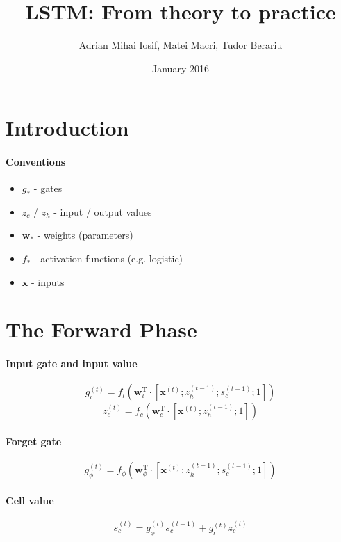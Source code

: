 \documentclass[12pt]{article}
\title{LSTM: From theory to practice}
\author{Adrian Mihai Iosif, Matei Macri, Tudor Berariu}
\date{January 2016}
\begin{document}
\maketitle

\section{Introduction}

\paragraph{Conventions}
\begin{itemize}
    \item $g_{*}$ - gates
    \item $z_{c}$ / $z_h$ - input / output values
    \item $\mathbf{w}_{*}$ - weights (parameters)
    \item $f_{*}$ - activation functions (e.g. logistic)
    \item $\mathbf{x}$ - inputs
\end{itemize}

\section{The Forward Phase}

\paragraph{Input gate and input value}

$$g_{\iota}^{(t)} = f_{\iota}\left(\mathbf{w}_{\iota}^{\text{T}} \cdot \left[\mathbf{x}^{(t)}; z_{h}^{(t-1)}; s_c^{(t-1)}; 1\right]\right)$$
$$z_{c}^{(t)} = f_{c}\left(\mathbf{w}_{c}^{\text{T}} \cdot \left[\mathbf{x}^{(t)}; z_{h}^{(t-1)}; 1\right]\right)$$

\paragraph{Forget gate}

$$g_{\phi}^{(t)} = f_{\phi}\left(\mathbf{w}_{\phi}^{\text{T}} \cdot \left[\mathbf{x}^{(t)}; z_{h}^{(t-1)}; s_c^{(t-1)}; 1\right]\right)$$

\paragraph{Cell value}

$$s_c^{(t)} = g_{\phi}^{(t)} s_c^{(t-1)} + g_{\iota}^{(t)} z_{c}^{(t)}$$
\end{document}
